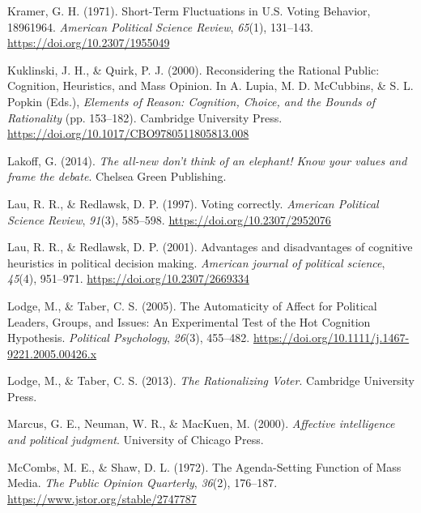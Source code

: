 \documentclass[
]{article}
\newlength{\cslhangindent}
\newlength{\cslentryspacingunit} %
\newenvironment{CSLReferences}[2] %
 {%
  \setlength{\parindent}{0pt}
  \ifodd #1
  \let\oldpar\par
  \def\par{\hangindent=\cslhangindent\oldpar}
  \fi
  \setlength{\parskip}{#2\cslentryspacingunit}
 }%
 {}
\begin{document}
\begin{CSLReferences}{1}{0}
\leavevmode{}%
Kramer, G. H. (1971). Short-{Term Fluctuations} in {U}.{S}. {Voting
Behavior}, 1896{\textendash}1964. \emph{American Political Science
Review}, \emph{65}(1), 131--143. \url{https://doi.org/10.2307/1955049}

\leavevmode{}%
Kuklinski, J. H., \& Quirk, P. J. (2000). Reconsidering the {Rational
Public}: {Cognition}, {Heuristics}, and {Mass Opinion}. In A. Lupia, M.
D. McCubbins, \& S. L. Popkin (Eds.), \emph{Elements of {Reason}:
{Cognition}, {Choice}, and the {Bounds} of {Rationality}} (pp.
153--182). {Cambridge University Press}.
\url{https://doi.org/10.1017/CBO9780511805813.008}

\leavevmode{}%
Lakoff, G. (2014). \emph{The all-new don't think of an elephant! Know
your values and frame the debate}. {Chelsea Green Publishing}.

\leavevmode{}%
Lau, R. R., \& Redlawsk, D. P. (1997). {Voting correctly}.
\emph{American Political Science Review}, \emph{91}(3), 585--598.
\url{https://doi.org/10.2307/2952076}

\leavevmode{}%
Lau, R. R., \& Redlawsk, D. P. (2001). {Advantages and disadvantages of
cognitive heuristics in political decision making}. \emph{American
journal of political science}, \emph{45}(4), 951--971.
\url{https://doi.org/10.2307/2669334}

\leavevmode{}%
Lodge, M., \& Taber, C. S. (2005). The {Automaticity} of {Affect} for
{Political Leaders}, {Groups}, and {Issues}: {An Experimental Test} of
the {Hot Cognition Hypothesis}. \emph{Political Psychology},
\emph{26}(3), 455--482.
\url{https://doi.org/10.1111/j.1467-9221.2005.00426.x}

\leavevmode{}%
Lodge, M., \& Taber, C. S. (2013). \emph{The {Rationalizing Voter}}.
{Cambridge University Press}.

\leavevmode{}%
Marcus, G. E., Neuman, W. R., \& MacKuen, M. (2000). \emph{Affective
intelligence and political judgment}. {University of Chicago Press}.

\leavevmode{}%
McCombs, M. E., \& Shaw, D. L. (1972). The {Agenda-Setting Function} of
{Mass Media}. \emph{The Public Opinion Quarterly}, \emph{36}(2),
176--187. \url{https://www.jstor.org/stable/2747787}


\end{CSLReferences}
\end{document}
